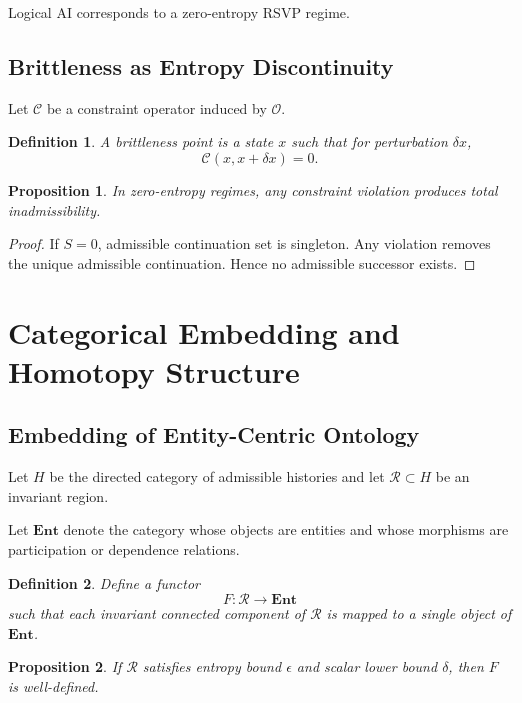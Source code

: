 \documentclass[12pt]{article}
\newtheorem{proposition}{Proposition}
\newtheorem{definition}{Definition}
\begin{document}
\begin{corollary}
Logical AI corresponds to a zero-entropy RSVP regime.
\end{corollary}

\subsection{Brittleness as Entropy Discontinuity}

Let $\mathcal{C}$ be a constraint operator induced by $\mathcal{O}$.

\begin{definition}
A brittleness point is a state $x$ such that for perturbation $\delta x$,
\[
\mathcal{C}(x, x+\delta x) = 0.
\]
\end{definition}

\begin{proposition}
In zero-entropy regimes, any constraint violation produces total inadmissibility.
\end{proposition}

\begin{proof}
If $S=0$, admissible continuation set is singleton. Any violation removes the unique admissible continuation. Hence no admissible successor exists.
\end{proof}

\section{Categorical Embedding and Homotopy Structure}

\subsection{Embedding of Entity-Centric Ontology}

Let $H$ be the directed category of admissible histories and let $\mathcal{R} \subset H$ be an invariant region.

Let $\mathbf{Ent}$ denote the category whose objects are entities and whose morphisms are participation or dependence relations.

\begin{definition}
Define a functor
\[
F : \mathcal{R} \to \mathbf{Ent}
\]
such that each invariant connected component of $\mathcal{R}$ is mapped to a single object of $\mathbf{Ent}$.
\end{definition}

\begin{proposition}
If $\mathcal{R}$ satisfies entropy bound $\epsilon$ and scalar lower bound $\delta$, then $F$ is well-defined.
\end{proposition}
\end{document}
